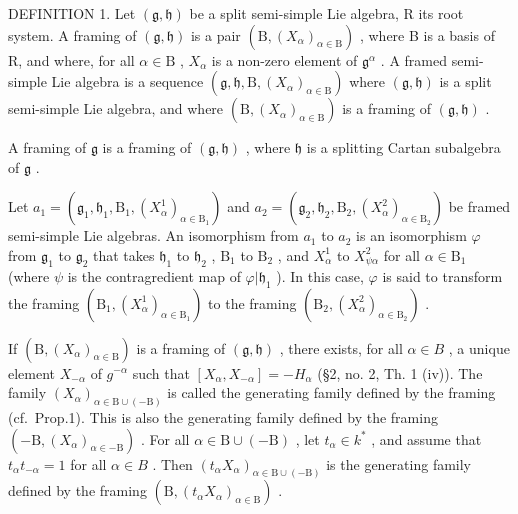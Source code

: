 DEFINITION 1. Let \((\mathfrak{g},\mathfrak{h})\) be a split semi-simple Lie algebra, R its root system. A framing of \((\mathfrak{g},\mathfrak{h})\) is a pair \((\mathrm{B},(X_{\alpha})_{\alpha \in \mathrm{B}})\) , where B is a basis of R, and where, for all \(\alpha \in \mathrm{B}\) , \(X_{\alpha}\) is a non-zero element of \(\mathfrak{g}^{\alpha}\) . A framed semi-simple Lie algebra is a sequence \((\mathfrak{g},\mathfrak{h},\mathrm{B},(X_{\alpha})_{\alpha \in \mathrm{B}})\) where \((\mathfrak{g},\mathfrak{h})\) is a split semi-simple Lie algebra, and where \((\mathrm{B},(X_{\alpha})_{\alpha \in \mathrm{B}})\) is a framing of \((\mathfrak{g},\mathfrak{h})\) .

A framing of \(\mathfrak{g}\) is a framing of \((\mathfrak{g},\mathfrak{h})\) , where \(\mathfrak{h}\) is a splitting Cartan subalgebra of \(\mathfrak{g}\) .

Let \(a_1 = (\mathfrak{g}_1, \mathfrak{h}_1, \mathrm{B}_1, (X_\alpha^1)_{\alpha \in \mathrm{B}_1})\) and \(a_2 = (\mathfrak{g}_2, \mathfrak{h}_2, \mathrm{B}_2, (X_\alpha^2)_{\alpha \in \mathrm{B}_2})\) be framed semi-simple Lie algebras. An isomorphism from \(a_1\) to \(a_2\) is an isomorphism \(\varphi\) from \(\mathfrak{g}_1\) to \(\mathfrak{g}_2\) that takes \(\mathfrak{h}_1\) to \(\mathfrak{h}_2\) , \(\mathrm{B}_1\) to \(\mathrm{B}_2\) , and \(X_\alpha^1\) to \(X_{\psi \alpha}^2\) for all \(\alpha \in \mathrm{B}_1\) (where \(\psi\) is the contragredient map of \(\varphi | \mathfrak{h}_1\) ). In this case, \(\varphi\) is said to transform the framing \((\mathrm{B}_1, (X_\alpha^1)_{\alpha \in \mathrm{B}_1})\) to the framing \((\mathrm{B}_2, (X_\alpha^2)_{\alpha \in \mathrm{B}_2})\) .

If \((\mathrm{B},(X_{\alpha})_{\alpha\in\mathrm{B}})\) is a framing of \((\mathfrak{g},\mathfrak{h})\) , there exists, for all \(\alpha\in B\) , a unique element \(X_{-\alpha}\) of \(g^{-\alpha}\) such that \([X_{\alpha},X_{-\alpha}]=-H_{\alpha}\) (§2, no. 2, Th. 1 (iv)). The family \((X_{\alpha})_{\alpha\in\mathrm{B}\cup(-\mathrm{B})}\) is called the generating family defined by the framing (cf.~Prop.1). This is also the generating family defined by the framing \((-\mathrm{B},(X_{\alpha})_{\alpha\in-\mathrm{B}})\) . For all \(\alpha\in\mathrm{B}\cup(-\mathrm{B})\) , let \(t_{\alpha}\in k^{*}\) , and assume that \(t_{\alpha}t_{-\alpha}=1\) for all \(\alpha\in B\) . Then \((t_{\alpha}X_{\alpha})_{\alpha\in\mathrm{B}\cup(-\mathrm{B})}\) is the generating family defined by the framing \((\mathrm{B},(t_{\alpha}X_{\alpha})_{\alpha\in\mathrm{B}})\) .

